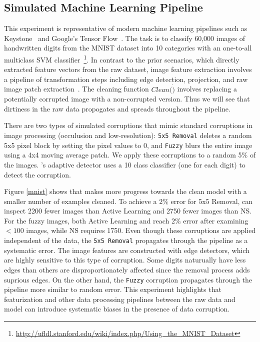 \subsection{Simulated Machine Learning Pipeline}
This experiment is representative of modern machine learning pipelines such as Keystone~\cite{keystone} and Google's Tensor Flow~\cite{tensor}. 
The task is to classify 60,000 images of handwritten digits from the MNIST dataset into 10 categories with an one-to-all multiclass SVM classifier~\footnote{\scriptsize\url{http://ufldl.stanford.edu/wiki/index.php/Using_the_MNIST_Dataset}}. 
In contrast to the prior scenarios, which directly extracted feature vectors from the raw dataset, image feature extraction involves a pipeline of transformation steps including edge detection, projection, and raw image patch extraction~\cite{keystone,tensor}.
The cleaning function $Clean(\dot)$ involves replacing a potentially corrupted image with a non-corrupted version.
Thus we will see that dirtiness in the raw data propogates and spreads throughout the pipeline.

There are two types of simulated corruptions that mimic standard corruptions in image processing (occulusion and low-resolution): \texttt{5x5 Removal} deletes a random 5x5 pixel block by setting the pixel values to 0, and \texttt{Fuzzy} blurs the entire image using a 4x4 moving average patch. 
We apply these corruptions to a random 5\% of the images.
\sys's adaptive detector uses a 10 class classifier (one for each digit) to detect the corruption.

Figure \ref{mnist} shows that \sys makes more progress towards the clean model with a smaller number of examples cleaned.
To achieve a 2\% error for 5x5 Removal, \sys can inspect 2200 fewer images than Active Learning and 2750 fewer images than NS.
For the fuzzy images, both Active Learning and \sys reach 2\% error after examining $<100$ images, while NS requires 1750.
Even though these corruptions are applied independent of the data, the \texttt{5x5 Removal} propagates through the pipeline as a systematic error.
The image features are constructed with edge detectors, which are highly sensitive to this type of corruption.
Some digits naturually have less edges than others are disproportionately affected since the removal process adds suprious edges.
On the other hand, the \texttt{Fuzzy} corruption propagates through the pipeline more similar to random error.
This experiment highlights that featurization and other data processing pipelines between the raw data and model can introduce systematic biases in the presence of data corruption.

